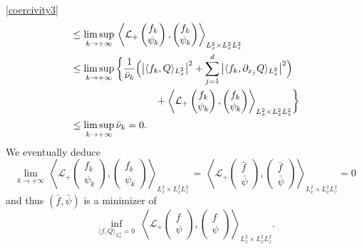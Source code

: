 \begin{ProofOf}{\eqref{coercivity3}}
\begin{align*}
&\leq\underset{k\to+\infty}{\limsup}\,\left\langle\mathcal{L}_{+}\begin{pmatrix} f_{k}\\\psi_{k} \end{pmatrix},\begin{pmatrix} f_{k}\\\psi_{k} \end{pmatrix}\right\rangle_{L_{x}^{2}\times L_{x}^{2}L_{z}^{2}}\\
&\leq\underset{k\to +\infty}{\limsup}\,\biggl\{\frac{1}{\bar{\nu}_{k}}\Bigl(\left|\langle f_{k},Q\rangle_{L_{x}^{2}}\right|^{2}
+\sum\limits_{j=1}^{d}\left|\langle f_{k},\partial_{x_{j}}Q\rangle_{L_{x}^{2}}\right|^{2}\Bigr)
\\
&\hspace*{3cm}+\left\langle\mathcal{L}_{+}\begin{pmatrix} f_{k}\\\psi_{k} \end{pmatrix},\begin{pmatrix} f_{k}\\\psi_{k} \end{pmatrix}\right\rangle_{L_{x}^{2}\times L_{x}^{2}L_{z}^{2}}\biggr\}\\
&\leq\underset{k\to+\infty}{\limsup}\,\bar{\nu}_{k}=0.
\end{align*}
We eventually deduce
\begin{equation}\label{cv_LL+}
\underset{k\to+\infty}{\lim}\,\left\langle\mathcal{L}_{+}\begin{pmatrix} f_{k}\\\psi_{k} \end{pmatrix},\begin{pmatrix} f_{k}\\\psi_{k} \end{pmatrix}\right\rangle_{L_{x}^{2}\times L_{x}^{2}L_{z}^{2}}\,=\, \left\langle\mathcal{L}_{+}\begin{pmatrix} \bar{f}\\\bar{\psi} \end{pmatrix},\begin{pmatrix} \bar{f}\\\bar{\psi} \end{pmatrix}\right\rangle_{L_{x}^{2}\times L_{x}^{2}L_{z}^{2}}=0
\end{equation}
and thus $(\bar{f},\bar{\psi})$ is a minimizer of
\begin{equation}\label{min_LL+}
\underset{\langle f,Q\rangle_{L_{x}^{2}}=0}{\inf}\;\left\langle\mathcal{L}_{+}\begin{pmatrix} f\\\psi \end{pmatrix},\begin{pmatrix} f\\\psi \end{pmatrix}\right\rangle_{L_{x}^{2}\times L_{x}^{2}L_{z}^{2}}.

\end{equation}
\end{ProofOf}
